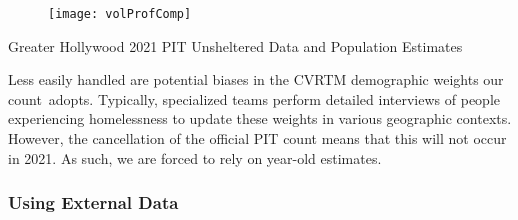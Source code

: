 \documentclass[11pt,twocolumn]{article}
\def\Count{count}
\begin{document}
\begin{figure}[]
	\centering
	\texttt{[image: volProfComp]}
	\caption{}
\end{figure}


\begin{table}[t!]
\caption{Greater Hollywood 2021 PIT Unsheltered Data and Population Estimates}
\caption*{Parentheses denote 90\% uncertainties(binomial in the case of the categories). 
Uncertainties larger than estimates imply that only upper limits are available. No unaccompanied 
minors or families were observed.}
\label{tbl:summary}
\end{table}

Less easily handled are potential biases in the CVRTM demographic weights our \Count\ adopts.
Typically, specialized teams perform detailed interviews of people experiencing homelessness to update 
these weights in various geographic contexts. However, the cancellation of the official PIT count means
that this will not occur in 2021. As such, we are forced to rely on year-old estimates.


\subsubsection{Using External Data}
\label{sec:bidData}
\end{document}
